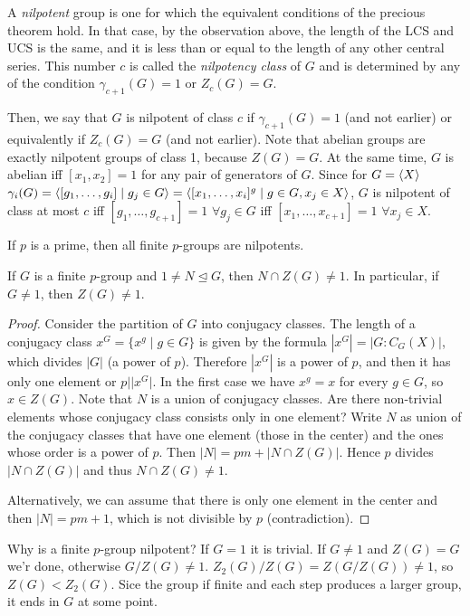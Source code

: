 \documentclass[twoside, 11pt]{article}
\begin{document}
\begin{defi}
A \emph{nilpotent} group is one for which the equivalent conditions of the precious theorem hold. In that case, by the observation above, the length of the LCS and UCS is the same, and it is less than or equal to the length of any other central series. This number $c$ is called the \emph{nilpotency class} of $G$ and is determined by any of the condition $\gamma_{c+1}(G)=1$ or $Z_c(G)=G$. 
\end{defi}


Then, we say that $G$ is nilpotent of class $c$ if $\gamma_{c+1}(G)=1$ (and not earlier) or equivalently if $Z_c(G)=G$ (and not earlier). Note that abelian groups are exactly nilpotent groups of class 1, because $Z(G)=G$. At the same time, $G$ is abelian iff $[x_1,x_2]=1$ for any pair of generators of $G$. Since for $G=\langle{X}\rangle$ $\gamma_i(G)=\langle{[g_1,\dots, g_i]\mid g_j\in G}\rangle=\langle{[x_1,\dots, x_i]^g\mid g\in G, x_j\in X}\rangle$, $G$ is nilpotent of class at most $c$ iff $[g_1,\dots, g_{c+1}]=1$ $\forall g_j\in G$ iff $[x_1,\dots, x_{c+1}]=1$ $\forall x_j\in X$.

\begin{ej}
If $p$ is a prime, then all finite $p$-groups are nilpotents.

\begin{lemma}
If $G$ is a finite $p$-group and $1\neq N\trianglelefteq G$, then $N\cap Z(G)\neq 1$. In particular, if $G\neq 1$, then $Z(G)\neq 1$. 
\end{lemma}
\begin{proof}
Consider the partition of $G$ into conjugacy classes. The length of a conjugacy class $x^G=\{x^g\mid g\in G\}$ is given by the formula $|x^G|=|G:C_G(X)|$, which divides $|G|$ (a power of $p$). Therefore $|x^G|$ is a power of $p$, and then it has only one element or $p | |x^G|$. In the first case we have $x^g=x$ for every $g\in G$, so $x\in Z(G)$. Note that $N$ is a union of conjugacy classes. Are there non-trivial elements whose conjugacy class consists only in one element? Write $N$ as union of the conjugacy classes that have one element (those in the center) and the ones whose order is a power of $p$. Then $|N|=pm+|N\cap Z(G)|$. Hence $p$ divides $|N\cap Z(G)|$ and thus $N\cap Z(G)\neq 1$. 

Alternatively, we can assume that there is only one element in the center and then $|N|=pm+1$, which is not divisible by $p$ (contradiction).
\end{proof}

Why is a finite $p$-group nilpotent? If $G=1$ it is trivial. If $G\neq 1$ and $Z(G)=G$ we'r done, otherwise $G/Z(G)\neq 1$. $Z_2(G)/Z(G)=Z(G/Z(G))\neq 1$, so $Z(G)<Z_2(G)$. Sice the group if finite and each step produces a larger group, it ends in $G$ at some point.
\end{ej} 
\end{document}
